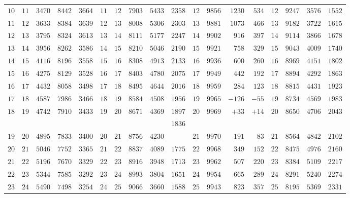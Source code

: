 \begin{GaussVISolarFrame}
\begin{tabular}{r|r|r|r|r||r|r|r|r|r||r|r|r|r||r|r|r|r}
$10$ & $11$ & $3470$ & $8442$ & $3664$ & $11$ & $12$ & $7903$ & $5433$ & $2358$ & $12$ & $9856$ & $1230$ & $534$ & $12$ & $9247$ & $3576$ & $1552$\\
$11$ & $12$ & $3633$ & $8384$ & $3639$ & $12$ & $13$ & $8008$ & $5306$ & $2303$ & $13$ & $9881$ & $1073$ & $466$ & $13$ & $9182$ & $3722$ & $1615$\\
$12$ & $13$ & $3795$ & $8324$ & $3613$ & $13$ & $14$ & $8111$ & $5177$ & $2247$ & $14$ & $9902$ & $916$ & $397$ & $14$ & $9114$ & $3866$ & $1678$\\
$13$ & $14$ & $3956$ & $8262$ & $3586$ & $14$ & $15$ & $8210$ & $5046$ & $2190$ & $15$ & $9921$ & $758$ & $329$ & $15$ & $9043$ & $4009$ & $1740$\\[3pt]
$14$ & $15$ & $4116$ & $8196$ & $3558$ & $15$ & $16$ & $8308$ & $4913$ & $2133$ & $16$ & $9936$ & $600$ & $260$ & $16$ & $8969$ & $4151$ & $1802$\\
$15$ & $16$ & $4275$ & $8129$ & $3528$ & $16$ & $17$ & $8403$ & $4780$ & $2075$ & $17$ & $9949$ & $442$ & $192$ & $17$ & $8894$ & $4292$ & $1863$\\
$16$ & $17$ & $4432$ & $8058$ & $3498$ & $17$ & $18$ & $8495$ & $4644$ & $2016$ & $18$ & $9959$ & $284$ & $123$ & $18$ & $8815$ & $4431$ & $1923$\\
$17$ & $18$ & $4587$ & $7986$ & $3466$ & $18$ & $19$ & $8584$ & $4508$ & $1956$ & $19$ & $9965$ & $-126$ & $-55$ & $19$ & $8734$ & $4569$ & $1983$\\
$18$ & $19$ & $4742$ & $7910$ & $3433$ & $19$ & $20$ & $8671$ & $4369$ & $1897$ & $20$ & $9969$ & $+33$ & $+14$ & $20$ & $8650$ & $4706$ & $2043$\\
 &  &  &  &  &  &  &  &  & $1836$ &  &  &  &  &  &  &  & \\
$19$ & $20$ & $4895$ & $7833$ & $3400$ & $20$ & $21$ & $8756$ & $4230$ &  & $21$ & $9970$ & $191$ & $83$ & $21$ & $8564$ & $4842$ & $2102$\\
$20$ & $21$ & $5046$ & $7752$ & $3365$ & $21$ & $22$ & $8837$ & $4089$ & $1775$ & $22$ & $9968$ & $349$ & $152$ & $22$ & $8475$ & $4976$ & $2160$\\
$21$ & $22$ & $5196$ & $7670$ & $3329$ & $22$ & $23$ & $8916$ & $3948$ & $1713$ & $23$ & $9962$ & $507$ & $220$ & $23$ & $8384$ & $5109$ & $2217$\\
$22$ & $23$ & $5344$ & $7585$ & $3292$ & $23$ & $24$ & $8993$ & $3804$ & $1651$ & $24$ & $9954$ & $665$ & $289$ & $24$ & $8291$ & $5240$ & $2274$\\
$23$ & $24$ & $5490$ & $7498$ & $3254$ & $24$ & $25$ & $9066$ & $3660$ & $1588$ & $25$ & $9943$ & $823$ & $357$ & $25$ & $8195$ & $5369$ & $2331$\\[3pt]

\end{tabular}
\end{GaussVISolarFrame}
